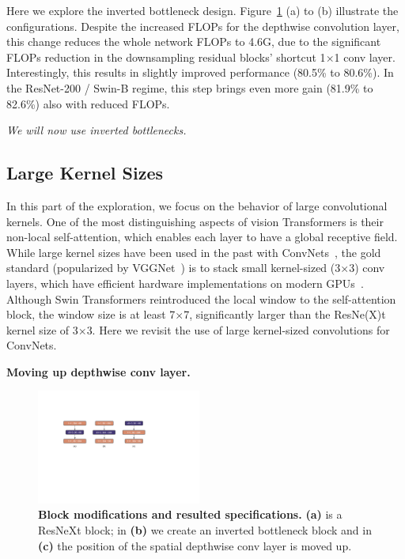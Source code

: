 \documentclass[10pt,twocolumn,letterpaper]{article}
\renewcommand{\paragraph}[1]{\vspace{1.25mm}\noindent\textbf{#1}}
\begin{document}
Here we explore the inverted bottleneck design. Figure~\ref{fig:inverted} (a) to (b) illustrate the configurations. Despite the increased FLOPs for the depthwise convolution layer, this change reduces the whole network FLOPs to 4.6G, due to the significant FLOPs reduction in the downsampling residual blocks' shortcut 1$\times$1 conv layer.
Interestingly, this results in slightly improved performance (80.5\% to 80.6\%). In the ResNet-200 / Swin-B regime, this step brings even more gain (81.9\% to 82.6\%) also with reduced FLOPs.

\textit{We will now use inverted bottlenecks.}

\subsection{Large Kernel Sizes}
\vspace{-0.2em}

In this part of the exploration, we focus on the behavior of large convolutional kernels. One of the most distinguishing aspects of vision Transformers is their non-local self-attention, which enables each layer to have a global receptive field. While large kernel sizes have been used in the past with ConvNets~\cite{Krizhevsky2012,Szegedy2015}, the gold standard (popularized by VGGNet~\cite{Simonyan2015}) is to stack small kernel-sized (3$\times$3) conv layers, which have efficient hardware implementations on modern GPUs~\cite{Lavin2016FastAF}. Although Swin Transformers reintroduced the local window to the self-attention block, the window size is at least 7$\times$7, significantly larger than the ResNe(X)t kernel size of 3$\times$3. Here we revisit the use of large kernel-sized convolutions for ConvNets. 

\paragraph{Moving up depthwise conv layer.}

\begin{figure}
\centering
\includegraphics[width=0.48\textwidth]{figs/inverted_v2.pdf}
\vspace{-1.5em}
\caption{\textbf{Block modifications and resulted specifications.} \textbf{(a)} is a ResNeXt block; in \textbf{(b)} we create an inverted bottleneck block and in \textbf{(c)} the position of the spatial depthwise conv layer is moved up.}
\label{fig:inverted}\vspace{-1em}
\end{figure}
\end{document}
